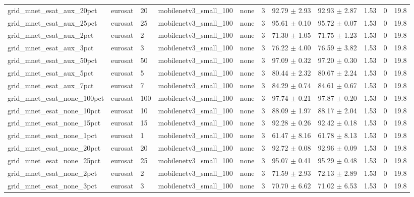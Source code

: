 \begin{tabular}{lllllllllll}
grid_mnet_esat_aux_20pct & eurosat & 20 & mobilenetv3_small_100 & none & 3 & 92.79 $\pm$ 2.93 & 92.93 $\pm$ 2.87 & 1.53 & 0 & 19.8 \\
grid_mnet_esat_aux_25pct & eurosat & 25 & mobilenetv3_small_100 & none & 3 & 95.61 $\pm$ 0.10 & 95.72 $\pm$ 0.07 & 1.53 & 0 & 19.8 \\
grid_mnet_esat_aux_2pct & eurosat & 2 & mobilenetv3_small_100 & none & 3 & 71.30 $\pm$ 1.05 & 71.75 $\pm$ 1.23 & 1.53 & 0 & 19.8 \\
grid_mnet_esat_aux_3pct & eurosat & 3 & mobilenetv3_small_100 & none & 3 & 76.22 $\pm$ 4.00 & 76.59 $\pm$ 3.82 & 1.53 & 0 & 19.8 \\
grid_mnet_esat_aux_50pct & eurosat & 50 & mobilenetv3_small_100 & none & 3 & 97.09 $\pm$ 0.32 & 97.20 $\pm$ 0.30 & 1.53 & 0 & 19.8 \\
grid_mnet_esat_aux_5pct & eurosat & 5 & mobilenetv3_small_100 & none & 3 & 80.44 $\pm$ 2.32 & 80.67 $\pm$ 2.24 & 1.53 & 0 & 19.8 \\
grid_mnet_esat_aux_7pct & eurosat & 7 & mobilenetv3_small_100 & none & 3 & 84.29 $\pm$ 0.74 & 84.61 $\pm$ 0.67 & 1.53 & 0 & 19.8 \\
grid_mnet_esat_none_100pct & eurosat & 100 & mobilenetv3_small_100 & none & 3 & 97.74 $\pm$ 0.21 & 97.87 $\pm$ 0.20 & 1.53 & 0 & 19.8 \\
grid_mnet_esat_none_10pct & eurosat & 10 & mobilenetv3_small_100 & none & 3 & 88.09 $\pm$ 1.97 & 88.17 $\pm$ 2.04 & 1.53 & 0 & 19.8 \\
grid_mnet_esat_none_15pct & eurosat & 15 & mobilenetv3_small_100 & none & 3 & 92.28 $\pm$ 0.26 & 92.42 $\pm$ 0.18 & 1.53 & 0 & 19.8 \\
grid_mnet_esat_none_1pct & eurosat & 1 & mobilenetv3_small_100 & none & 3 & 61.47 $\pm$ 8.16 & 61.78 $\pm$ 8.13 & 1.53 & 0 & 19.8 \\
grid_mnet_esat_none_20pct & eurosat & 20 & mobilenetv3_small_100 & none & 3 & 92.72 $\pm$ 0.08 & 92.96 $\pm$ 0.09 & 1.53 & 0 & 19.8 \\
grid_mnet_esat_none_25pct & eurosat & 25 & mobilenetv3_small_100 & none & 3 & 95.07 $\pm$ 0.41 & 95.29 $\pm$ 0.48 & 1.53 & 0 & 19.8 \\
grid_mnet_esat_none_2pct & eurosat & 2 & mobilenetv3_small_100 & none & 3 & 71.59 $\pm$ 2.93 & 72.13 $\pm$ 2.89 & 1.53 & 0 & 19.8 \\
grid_mnet_esat_none_3pct & eurosat & 3 & mobilenetv3_small_100 & none & 3 & 70.70 $\pm$ 6.62 & 71.02 $\pm$ 6.53 & 1.53 & 0 & 19.8 \\

\end{tabular}

